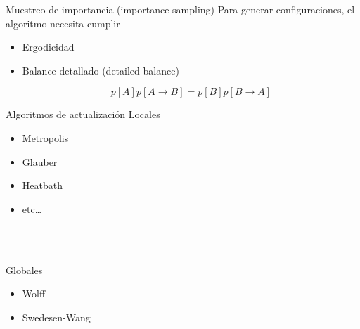 \documentclass[11pt]{beamer}
\begin{document}
\begin{frame}{Muestreo de importancia (importance sampling)}
    Para generar configuraciones, el algoritmo necesita cumplir
    \begin{itemize}
        \item<1-> Ergodicidad
        \begin{center}
        \end{center}
        \item<2-> Balance detallado (detailed balance)
        \begin{center}
    \end{center}
    $$ p[A]p[A \to B] = p[B]p[B \to A]$$
    \end{itemize}
    
    
\end{frame}

\begin{frame}{Algoritmos de actualización}
    Locales
    \begin{itemize}
        \item Metropolis
        \item Glauber
        \item Heatbath
        \item etc\dots
    \end{itemize}
    
    \ \\~
    
    Globales
    \begin{itemize}
        \item Wolff
        \item Swedesen-Wang
    \end{itemize}
\end{frame}
\end{document}

